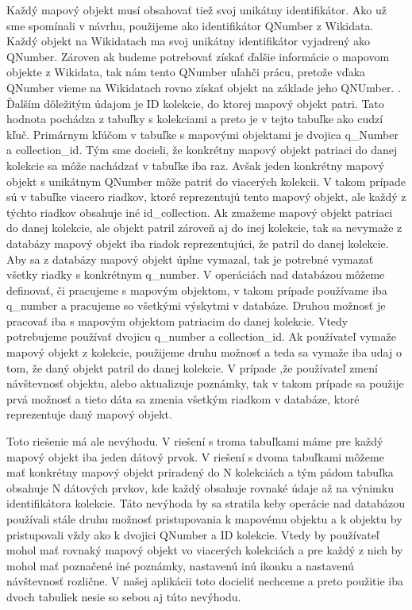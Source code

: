 Každý mapový objekt musí obsahovať tiež svoj unikátny identifikátor. Ako už sme spomínali v návrhu, použijeme ako identifikátor QNumber z Wikidata. Každý objekt na Wikidatach ma svoj unikátny identifikátor vyjadrený ako QNumber. Zároven  
ak budeme potrebovať získať ďalšie informácie o mapovom objekte z Wikidata, tak nám tento QNumber uľahči prácu, pretože vďaka QNumber vieme na Wikidatach rovno získať objekt na základe jeho QNUmber. . 
Ďalším dôležitým údajom je ID kolekcie, do ktorej mapový objekt patri. Tato hodnota pochádza z tabuľky s kolekciami a preto je v tejto tabuľke ako cudzí kľuč. 
Primárnym kľúčom v tabuľke s mapovými objektami je dvojica q\_Number a collection\_id. Tým sme docieli, že konkrétny mapový objekt patriaci do danej kolekcie sa môže nachádzať v tabuľke 
iba raz. Avšak jeden konkrétny mapový objekt s unikátnym QNumber môže patriť do viacerých kolekcii. V takom prípade sú v tabuľke viacero riadkov, ktoré reprezentujú tento mapový objekt, ale 
každý z týchto riadkov obsahuje iné id\_collection. Ak zmažeme mapový objekt patriaci do danej kolekcie, ale objekt patril zároveň aj do inej kolekcie, tak sa nevymaže z databázy mapový objekt iba riadok reprezentujúci, že 
patril do danej kolekcie. Aby sa z databázy mapový objekt úplne vymazal, tak je potrebné vymazať všetky riadky s konkrétnym q\_number. 
V operáciách nad databázou môžeme definovať, či pracujeme s mapovým objektom, v takom prípade používame iba q\_number a pracujeme so všetkými výskytmi v databáze. Druhou možnosť je pracovať iba 
s mapovým objektom patriacim do danej kolekcie. Vtedy potrebujeme používať dvojicu  q\_number a collection\_id. 
Ak používateľ vymaže mapový objekt z kolekcie, použijeme druhu možnosť a teda sa vymaže iba udaj o tom, že daný objekt patril do danej kolekcie. V prípade ,že používateľ zmení návštevnosť objektu, alebo 
aktualizuje poznámky, tak v takom prípade sa použije prvá možnosť a tieto dáta sa zmenia všetkým riadkom v databáze, ktoré reprezentuje daný mapový objekt. 

Toto riešenie má ale nevýhodu. V riešení s troma tabuľkami máme pre každý mapový objekt iba jeden dátový prvok. V riešení s dvoma tabuľkami môžeme mať konkrétny mapový objekt priradený do N kolekciách a tým pádom 
tabuľka obsahuje N dátových prvkov, kde každý obsahuje rovnaké údaje až na výnimku identifikátora kolekcie. Táto nevýhoda by sa stratila keby operácie nad databázou používali stále druhu možnosť pristupovania k mapovému objektu a k objektu by pristupovali vždy ako k dvojici 
QNumber a ID kolekcie. Vtedy by používateľ mohol mať rovnaký mapový objekt vo viacerých kolekciách a pre každý z nich by mohol mať poznačené iné poznámky, nastavenú inú ikonku a nastavenú návštevnosť rozlične. 
V našej aplikácii toto docieliť nechceme a preto použitie iba dvoch tabuliek nesie so sebou aj túto nevýhodu. 

